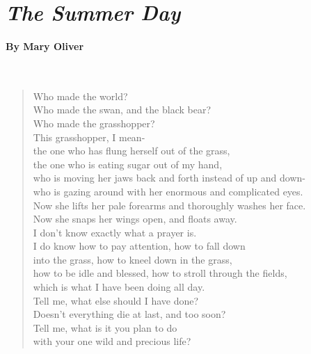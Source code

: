 \documentclass[10pt, letterpaper]{memoir}
\begin{document}
\vspace{0.75em}
\hspace{12em}
\begin{minipage}{0.8\linewidth}
\section*{\emph{The Summer Day}}
\paragraph{By Mary Oliver}~
\begin{verse}
	Who made the world?\\
	Who made the swan, and the black bear?\\
	Who made the grasshopper?\\
	This grasshopper, I mean-\\
	the one who has flung herself out of the grass,\\
	the one who is eating sugar out of my hand,\\
	who is moving her jaws back and forth instead of up and down-\\
	who is gazing around with her enormous and complicated eyes.\\
	Now she lifts her pale forearms and thoroughly washes her face.\\
	Now she snaps her wings open, and floats away.\\
	I don't know exactly what a prayer is.\\
	I do know how to pay attention, how to fall down\\
	into the grass, how to kneel down in the grass,\\
	how to be idle and blessed, how to stroll through the fields,\\
	which is what I have been doing all day.\\
	Tell me, what else should I have done?\\
	Doesn't everything die at last, and too soon?\\
	Tell me, what is it you plan to do\\
	with your one wild and precious life?
\end{verse}
\end{minipage}
\end{document}
